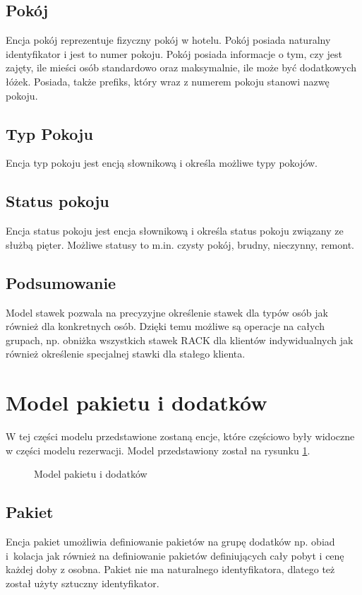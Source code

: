 \documentclass[a4paper,onecolumn,oneside,11pt,wide,floatssmall]{mwrep}
\theoremstyle{definition}
\theoremstyle{plain}%
\theoremstyle{remark}
\begin{document}
\subsection{Pokój}
Encja pokój reprezentuje fizyczny pokój w hotelu. Pokój posiada naturalny identyfikator i jest to numer pokoju. Pokój posiada informacje o tym, czy jest zajęty, ile mieści osób standardowo oraz maksymalnie, ile może być dodatkowych łóżek. Posiada, także prefiks, który wraz z numerem pokoju stanowi nazwę pokoju.

\subsection{Typ Pokoju}
Encja typ pokoju jest encją słownikową i określa możliwe typy pokojów.

\subsection{Status pokoju}
Encja status pokoju jest encja słownikową i określa status pokoju związany ze służbą pięter. Możliwe statusy to m.in. czysty pokój, brudny, nieczynny, remont.

\subsection{Podsumowanie}
Model stawek pozwala na precyzyjne określenie stawek dla typów osób jak również dla konkretnych osób. Dzięki temu możliwe są operacje na całych grupach, np. obniżka wszystkich stawek RACK dla klientów indywidualnych jak również określenie specjalnej stawki dla stałego klienta.


\section{Model pakietu i dodatków}
\label{model-pakietu-i-dodatkow}
W tej części modelu przedstawione zostaną encje, które częściowo były widoczne w części modelu rezerwacji. Model przedstawiony został na rysunku \ref{fig:db-logical-model-package}.

\begin{figure}[H]
  \begin{center}
  \end{center}
  \caption{Model pakietu i dodatków}
  \label{fig:db-logical-model-package}
\end{figure}

\subsection{Pakiet}
Encja pakiet umożliwia definiowanie pakietów na grupę dodatków np. obiad \mbox{i kolacja} jak również na definiowanie pakietów definiujących cały pobyt i cenę każdej doby z osobna. Pakiet nie ma naturalnego identyfikatora, dlatego też został użyty sztuczny identyfikator.
\end{document}

